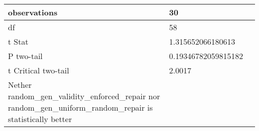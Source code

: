 \documentclass[11pt]{article}
\begin{document}
\begin{table}[H]
{\begin{tabular}{|l|l|l|}
    observations                                                                                                  & 30                                  &                                        \\ \hline
    df                                                                                                            & 58                                  &                                        \\ \hline
    t Stat                                                                                                        & 1.315652066180613                   &                                        \\ \hline
    P two-tail                                                                                                    & 0.19346782059815182                 &                                        \\ \hline
    t Critical two-tail                                                                                           & 2.0017                              &                                        \\ \hline
    Nether random\_gen\_validity\_enforced\_repair nor random\_gen\_uniform\_random\_repair is statistically better &                                     &                                        \\ \hline
    \end{tabular}%
    }
\end{table}
\end{document}
